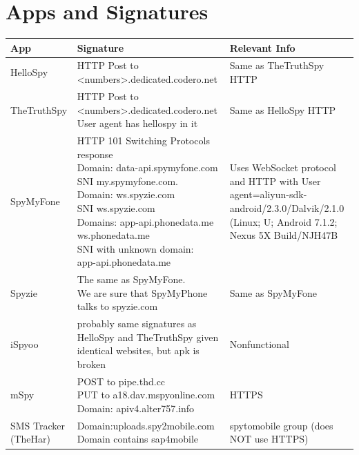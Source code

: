 \documentclass[acmtog]{acmart}
\begin{document}
\section{Apps and Signatures}
\begin{table}
\begin{tabular}{p{5cm}p{5cm}p{5cm}}
	\toprule
	App & Signature & Relevant Info \\
	\midrule
	HelloSpy & \makecell{HTTP Post to\\ <numbers>.dedicated.codero.net} & Same as TheTruthSpy HTTP \\
	
	TheTruthSpy & \makecell{HTTP Post to\\ <numbers>.dedicated.codero.net\\ User agent has hellospy in it} & Same as HelloSpy HTTP \\
	
	SpyMyFone & \makecell{HTTP 101 Switching Protocols response\\
	Domain: data-api.spymyfone.com\\SNI my.spymyfone.com.\\
	Domain: ws.spyzie.com\\SNI ws.spyzie.com\\
	Domains: app-api.phonedata.me\\ws.phonedata.me\\
	SNI with unknown domain:\\ app-api.phonedata.me} & Uses WebSocket protocol and HTTP with User agent=aliyun-sdk-android/2.3.0/Dalvik/2.1.0 (Linux; U; Android 7.1.2; Nexus 5X Build/NJH47B \\

	Spyzie & \makecell{The same as SpyMyFone.\\ We are sure that SpyMyPhone\\ talks to spyzie.com} & Same as SpyMyFone \\
	
	iSpyoo & probably same signatures as HelloSpy and TheTruthSpy given identical websites, but apk is broken & Nonfunctional \\
	
	mSpy & \makecell{POST to pipe.thd.cc\\
	PUT to a18.dav.mspyonline.com\\
	Domain: apiv4.alter757.info} & HTTPS \\
	
	SMS Tracker (TheHar) & \makecell{Domain:uploads.spy2mobile.com\\ Domain contains sap4mobile} & spytomobile group (does NOT use HTTPS) \\
	

\end{tabular}
\end{table}
\end{document}
